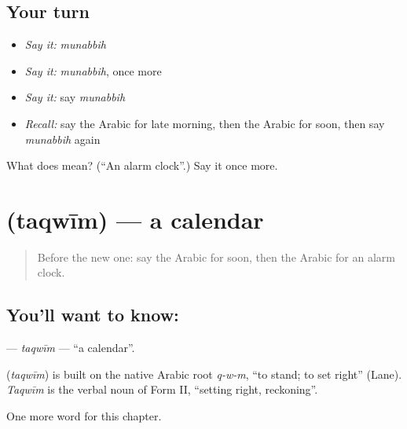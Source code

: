 \subsection*{Your turn}
\begin{itemize}
\raggedright
  \item \emph{Say it:} \emph{munabbih}
  \item \emph{Say it:} \emph{munabbih}, once more
  \item \emph{Say it:} say \emph{munabbih}
  \item \emph{Recall:} say the Arabic for late morning, then the Arabic for soon, then say \emph{munabbih} again
\end{itemize}

\begin{tcolorbox}[breakable,colback=teal!4,colframe=teal!35!black,title={Before you move on}]
What does  mean? (\textquotedblleft{}An alarm clock\textquotedblright{}.) Say it once more.
\end{tcolorbox}
\section[\texorpdfstring{\ar{تقويم} (taqwīm)}{تقويم (taqwīm)}]{ (taqwīm) — a calendar}

\label{lesson:AR-C234-taqwim}



\begin{quote}
Before the new one: say the Arabic for soon, then the Arabic for an alarm clock.
\end{quote}

\subsection*{You'll want to know: }
\textbf{} — \emph{taqwīm} — \textquotedblleft{}a calendar\textquotedblright{}.

\begin{cousinweb}
\textbf{} (\emph{taqwīm}) is built on the native Arabic root \emph{q-w-m}, \textquotedblleft{}to stand; to set right\textquotedblright{} (Lane). \emph{Taqwīm} is the verbal noun of Form II, \textquotedblleft{}setting right, reckoning\textquotedblright{}.
\end{cousinweb}

\begin{grammarlens}[title={What you've built}]
One more word for this chapter.
\end{grammarlens}


